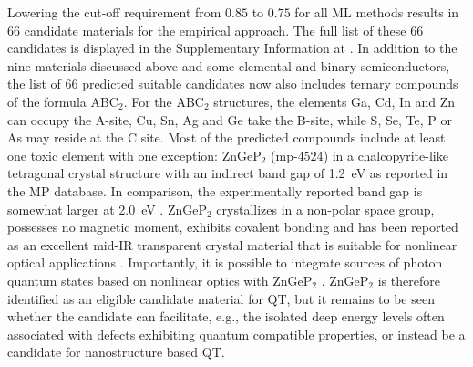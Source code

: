 \documentclass[superscriptaddress,
preprint,
 amsmath,amssymb,
 aps,
]{revtex4-2}
\begin{document}
Lowering the cut-off requirement from $0.85$ to $0.75$ for all ML methods results in $66$ candidate materials for the empirical approach.  
The full list of these $66$ candidates is displayed in the Supplementary Information at \cite{supplementary}. 
In addition to the nine materials discussed above and some elemental and binary semiconductors, the list of $66$ predicted suitable candidates now also includes ternary compounds of the formula ABC$_2$. For the ABC$_2$ structures, the elements Ga, Cd, In and Zn can occupy the A-site, Cu, Sn, Ag and Ge take the B-site, while S, Se, Te, P or As may reside at the C site. Most of the predicted compounds include at least one toxic element with one exception: ZnGeP$_2$ (mp-$4524$) in a chalcopyrite-like tetragonal crystal structure with an indirect band gap of \SI{1.2}{\electronvolt} \cite{Zhang2015} as reported in the MP database. In comparison, the experimentally reported band gap is somewhat larger at \SI{2.0}{\electronvolt} \cite{Xing1989}. 
ZnGeP$_2$ crystallizes in a non-polar space group, possesses no magnetic moment, exhibits covalent bonding and has been reported as an excellent mid-IR transparent crystal material that is suitable for nonlinear optical applications \cite{Zhang2015}. Importantly, it is possible to integrate sources of photon quantum states based on nonlinear optics with ZnGeP$_2$ \cite{Caspani2017}. 
ZnGeP$_2$ is therefore identified as an eligible candidate material for QT, but it remains to be seen whether the candidate can facilitate, e.g., the isolated deep energy levels often associated with defects exhibiting quantum compatible properties, or instead be a candidate for nanostructure based QT.  
\end{document}
